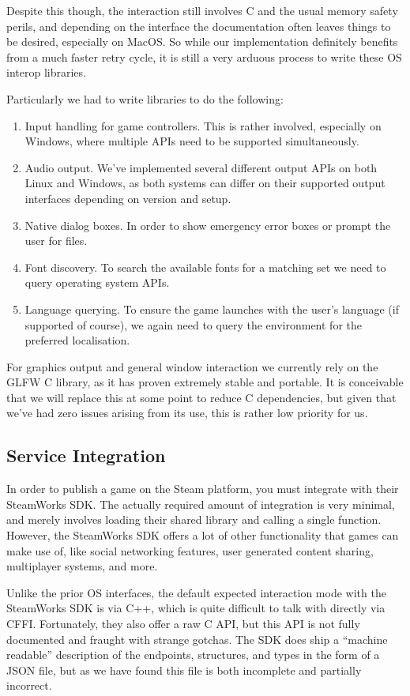 \documentclass[format=sigconf]{acmart}
\begin{document}
Despite this though, the interaction still involves C and the usual memory safety perils, and depending on the interface the documentation often leaves things to be desired, especially on MacOS. So while our implementation definitely benefits from a much faster retry cycle, it is still a very arduous process to write these OS interop libraries.

Particularly we had to write libraries to do the following:
\begin{enumerate}
\item Input handling for game controllers. This is rather involved, especially on Windows, where multiple APIs need to be supported simultaneously.
\item Audio output. We've implemented several different output APIs on both Linux and Windows, as both systems can differ on their supported output interfaces depending on version and setup.
\item Native dialog boxes. In order to show emergency error boxes or prompt the user for files.
\item Font discovery. To search the available fonts for a matching set we need to query operating system APIs.
\item Language querying. To ensure the game launches with the user's language (if supported of course), we again need to query the environment for the preferred localisation.
\end{enumerate}

For graphics output and general window interaction we currently rely on the GLFW C library, as it has proven extremely stable and portable. It is conceivable that we will replace this at some point to reduce C dependencies, but given that we've had zero issues arising from its use, this is rather low priority for us.

\subsection{Service Integration}\label{steam}
In order to publish a game on the Steam platform, you must integrate with their SteamWorks SDK. The actually required amount of integration is very minimal, and merely involves loading their shared library and calling a single function. However, the SteamWorks SDK offers a lot of other functionality that games can make use of, like social networking features, user generated content sharing, multiplayer systems, and more.

Unlike the prior OS interfaces, the default expected interaction mode with the SteamWorks SDK is via C++, which is quite difficult to talk with directly via CFFI. Fortunately, they also offer a raw C API, but this API is not fully documented and fraught with strange gotchas. The SDK does ship a ``machine readable'' description of the endpoints, structures, and types in the form of a JSON file, but as we have found this file is both incomplete and partially incorrect.
\end{document}
